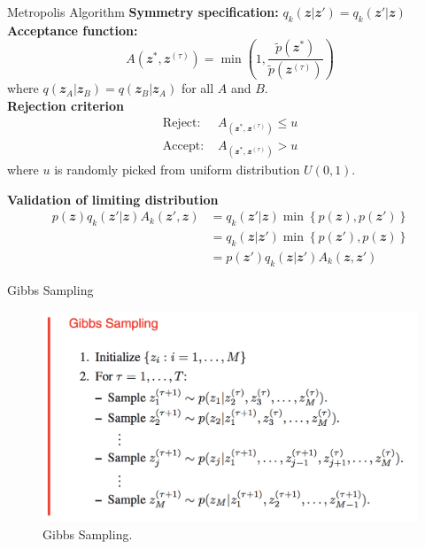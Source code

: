 \documentclass{bredelebeamer}
\begin{document}
\begin{frame}{Metropolis Algorithm}
  \textbf{Symmetry specification:} $q_k(\mathbfit{z}|\mathbfit{z}') = q_k(\mathbfit{z}'|\mathbfit{z})$
  \textbf{Acceptance function:}
  \begin{equation}
    A(\mathbfit{z}^{*}, \mathbfit{z}^{(\tau)})
    = \min
    \left(
      1,
      \frac{\tilde{p}(\mathbfit{z}^{*})}
      {\tilde{p}(\mathbfit{z}^{(\tau)})}
    \right)
  \end{equation}
  where $q(\mathbfit{z}_A|\mathbfit{z}_B) = q(\mathbfit{z}_B|\mathbfit{z}_A)$
  for all $A$ and $B$.
  \\[1.0\baselineskip]

  \textbf{Rejection criterion}
  \begin{equation}
    \begin{split}
      \textrm{Reject: } &A_(\mathbfit{z}^{*}, \mathbfit{z}^{(\tau)}) \leq u \\
      \textrm{Accept: } &A_(\mathbfit{z}^{*}, \mathbfit{z}^{(\tau)}) > u
    \end{split}
  \end{equation}
  where $u$ is randomly picked from uniform distribution $U(0,1)$.

  \textbf{Validation of limiting distribution}
  \begin{equation}
    \begin{split}
      p(\mathbfit{z}) q_k(\mathbfit{z}'|\mathbfit{z}) A_k(\mathbfit{z}', \mathbfit{z})
      &= q_k(\mathbfit{z}'|\mathbfit{z} ) \min{\left\{ p(\mathbfit{z} ), p(\mathbfit{z}') \right\}}  \\
      &= q_k(\mathbfit{z} |\mathbfit{z}') \min{\left\{ p(\mathbfit{z}'), p(\mathbfit{z}) \right\}}  \\
      &= p(\mathbfit{z}') q_k(\mathbfit{z}|\mathbfit{z}') A_k(\mathbfit{z}, \mathbfit{z}')
    \end{split}
  \end{equation}
\end{frame}

\begin{frame}{Gibbs Sampling}
  \begin{figure}
  \centering
  \includegraphics[scale=0.45]{gibbs_sampling.png}
  \caption{
    Gibbs Sampling.
  }
  \end{figure}
\end{frame}
\end{document}

